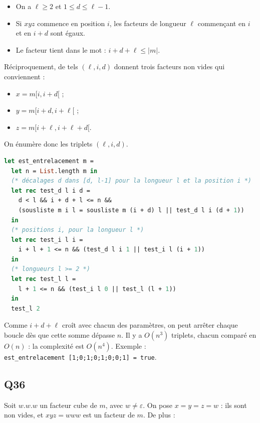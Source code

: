 \documentclass[11pt,a4paper]{article}
\providecommand{\tightlist}{\setlength{\itemsep}{0pt}\setlength{\parskip}{0pt}}
\begin{document}
\begin{itemize}
\tightlist
\item
  On a \(\ell\ge 2\) et \(1\le d\le\ell-1\).
\item
  Si \(xyz\) commence en position \(i\), les facteurs de longueur \(\ell\) commençant en \(i\) et en \(i+d\) sont égaux.
\item
  Le facteur tient dans le mot : \(i+d+\ell\le|m|\).
\end{itemize}

Réciproquement, de tels \((\ell,i,d)\) donnent trois facteurs non vides qui conviennent :

\begin{itemize}
\tightlist
\item
  \(x=m[i,i+d[\) ;
\item
  \(y=m[i+d,i+\ell[\) ;
\item
  \(z=m[i+\ell,i+\ell+d[\).
\end{itemize}

On énumère donc les triplets \((\ell,i,d)\).

\begin{lstlisting}[language=Caml]
let est_entrelacement m =
  let n = List.length m in
  (* décalages d dans [d, l-1] pour la longueur l et la position i *)
  let rec test_d l i d =
    d < l && i + d + l <= n &&
    (sousliste m i l = sousliste m (i + d) l || test_d l i (d + 1))
  in
  (* positions i, pour la longueur l *)
  let rec test_i l i =
    i + l + 1 <= n && (test_d l i 1 || test_i l (i + 1))
  in
  (* longueurs l >= 2 *)
  let rec test_l l =
    l + 1 <= n && (test_i l 0 || test_l (l + 1))
  in
  test_l 2
\end{lstlisting}

Comme \(i+d+\ell\) croît avec chacun des paramètres, on peut arrêter chaque boucle dès que cette somme dépasse \(n\). Il y a \(O(n^3)\) triplets, chacun comparé en \(O(n)\) : la complexité est \(O(n^4)\). Exemple : \texttt{est\_entrelacement\ {[}1;\allowbreak{}0;\allowbreak{}1;\allowbreak{}0;\allowbreak{}1;\allowbreak{}0;\allowbreak{}0;\allowbreak{}1{]}\allowbreak{}\ =\allowbreak{}\ true}.

\hypertarget{q36}{%
\subsection{Q36}\label{q36}}

Soit \(w.w.w\) un facteur cube de \(m\), avec \(w\neq\varepsilon\). On pose \(x=y=z=w\) : ils sont non vides, et \(xyz=www\) est un facteur de \(m\). De plus :
\end{document}
